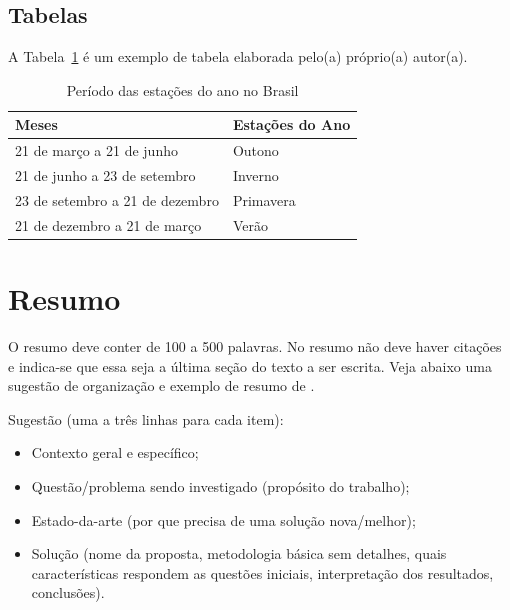 \documentclass[twoside,english,brazilian]{UNISINOSmonografia}
\begin{document}
\subsection{Tabelas}
A Tabela~\ref{tab:estacoes} é um exemplo de tabela elaborada pelo(a) próprio(a) autor(a).

\begin{table}
	\caption{Período das estações do ano no Brasil}
	\label{tab:estacoes}
	\centering%
	\begin{minipage}{.6\textwidth}
		\begin{tabular*}{\textwidth}{ll}
			\hline
			\textbf{Meses} & \textbf{Estações do Ano}\\
			\hline
			21 de março a 21 de junho & Outono\\
			21 de junho a 23 de setembro & Inverno\\
			23 de setembro a 21 de dezembro & Primavera\\
			21 de dezembro a 21 de março & Verão\\
			\hline
		\end{tabular*}
	\end{minipage}
\end{table}

\section{Resumo}
O resumo deve conter de 100 a 500 palavras. No resumo não deve haver citações e indica-se que essa seja a última seção do texto a ser escrita. Veja abaixo uma sugestão de organização e exemplo de resumo de .

Sugestão (uma a três linhas para cada item):
\begin{itemize}
	\item Contexto geral e específico;
	\item Questão/problema sendo investigado (propósito do trabalho);
	\item Estado-da-arte (por que precisa de uma solução nova/melhor);
	\item Solução (nome da proposta, metodologia básica sem detalhes, quais características respondem as questões iniciais, interpretação dos resultados, conclusões).
\end{itemize}
\end{document}
